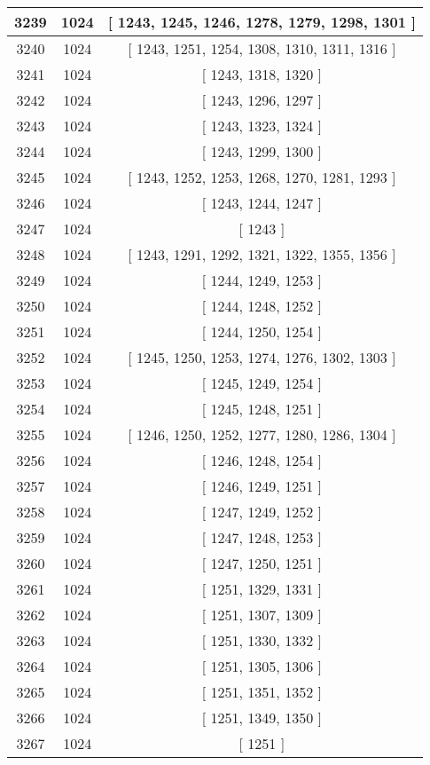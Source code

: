 \begin{center}
\begin{longtable}[H]{|| c c c ||}
\hline
3239 & 1024 & [ 1243, 1245, 1246, 1278, 1279, 1298, 1301 ] \\ 
\hline
3240 & 1024 & [ 1243, 1251, 1254, 1308, 1310, 1311, 1316 ] \\ 
\hline
3241 & 1024 & [ 1243, 1318, 1320 ] \\ 
\hline
3242 & 1024 & [ 1243, 1296, 1297 ] \\ 
\hline
3243 & 1024 & [ 1243, 1323, 1324 ] \\ 
\hline
3244 & 1024 & [ 1243, 1299, 1300 ] \\ 
\hline
3245 & 1024 & [ 1243, 1252, 1253, 1268, 1270, 1281, 1293 ] \\ 
\hline
3246 & 1024 & [ 1243, 1244, 1247 ] \\ 
\hline
3247 & 1024 & [ 1243 ] \\ 
\hline
3248 & 1024 & [ 1243, 1291, 1292, 1321, 1322, 1355, 1356 ] \\ 
\hline
3249 & 1024 & [ 1244, 1249, 1253 ] \\ 
\hline
3250 & 1024 & [ 1244, 1248, 1252 ] \\ 
\hline
3251 & 1024 & [ 1244, 1250, 1254 ] \\ 
\hline
3252 & 1024 & [ 1245, 1250, 1253, 1274, 1276, 1302, 1303 ] \\ 
\hline
3253 & 1024 & [ 1245, 1249, 1254 ] \\ 
\hline
3254 & 1024 & [ 1245, 1248, 1251 ] \\ 
\hline
3255 & 1024 & [ 1246, 1250, 1252, 1277, 1280, 1286, 1304 ] \\ 
\hline
3256 & 1024 & [ 1246, 1248, 1254 ] \\ 
\hline
3257 & 1024 & [ 1246, 1249, 1251 ] \\ 
\hline
3258 & 1024 & [ 1247, 1249, 1252 ] \\ 
\hline
3259 & 1024 & [ 1247, 1248, 1253 ] \\ 
\hline
3260 & 1024 & [ 1247, 1250, 1251 ] \\ 
\hline
3261 & 1024 & [ 1251, 1329, 1331 ] \\ 
\hline
3262 & 1024 & [ 1251, 1307, 1309 ] \\ 
\hline
3263 & 1024 & [ 1251, 1330, 1332 ] \\ 
\hline
3264 & 1024 & [ 1251, 1305, 1306 ] \\ 
\hline
3265 & 1024 & [ 1251, 1351, 1352 ] \\ 
\hline
3266 & 1024 & [ 1251, 1349, 1350 ] \\ 
\hline
3267 & 1024 & [ 1251 ] \\ 

\end{longtable}
\end{center}
